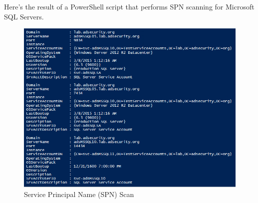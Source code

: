 Here’s the result of a PowerShell script that performs SPN scanning for Microsoft SQL Servers.
\begin{figure}
    \centering
    \includegraphics[width=0.75\linewidth]{spnscan1.png}
    \caption{Service Principal Name (SPN) Scan}
    \label{fig:placeholder}
\end{figure}

